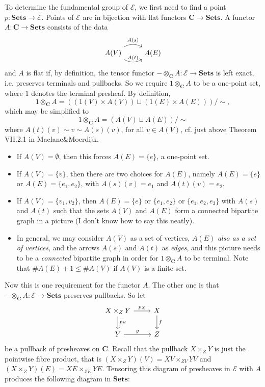To determine the fundamental group of $\mathscr{E}$, we first need to find a point $p : \mathbf{Sets} \to \mathscr{E}$. Points of $\mathscr{E}$ are in bijection with flat functors $\mathbf{C} \to \mathbf{Sets}$. A functor $A : \mathbf{C} \to \mathbf{Sets}$ consists of the data
\[ \begin{tikzcd} A(V) \arrow[r, bend left, "A(s)"] \arrow[r, bend right, "A(t)"] & A(E) \end{tikzcd} \]
and $A$ is flat if, by definition, the tensor functor $- \otimes_{\mathbf{C}} A : \mathscr{E} \to \mathbf{Sets}$ is left exact, i.e. preserves terminals and pullbacks. So we require $1 \otimes_{\mathbf{C}} A$ to be a one-point set, where $1$ denotes the terminal presheaf. By definition,
\[ 1 \otimes_{\mathbf{C}} A = \left( \left(1(V) \times A(V)\right) \sqcup \left(1(E) \times A(E) \right)\right) / \sim, \]
which may be simplified to
\[ 1 \otimes_{\mathbf{C}} A = \left( A(V) \sqcup A(E) \right) / \sim \]
where $A(t)(v) \sim v \sim A(s)(v)$, for all $v \in A(V)$, cf. just above Theorem VII.2.1 in Maclane\&Moerdijk.
\begin{itemize}
	\item If $A(V) = \emptyset$, then this forces $A(E) = \{e\}$, a one-point set.
	\item If $A(V) = \{v\}$, then there are two choices for $A(E)$, namely $A(E) = \{e\}$ or $A(E) = \{e_1,e_2\}$, with $A(s)(v) = e_1$ and $A(t)(v) = e_2$.
	\item If $A(V) = \{v_1,v_2\}$, then $A(E) = \{e\}$ or $\{e_1,e_2\}$ or $\{e_1,e_2,e_3\}$ with $A(s)$ and $A(t)$ such that the sets $A(V)$ and $A(E)$ form a connected bipartite graph in a picture (I don't know how to say this neatly).
	\item In general, we may consider $A(V)$ as a set of vertices, $A(E)$ \emph{also as a set of vertices}, and the arrows $A(s)$ and $A(t)$ as \emph{edges}, and this picture needs to be a \emph{connected} bipartite graph in order for $1 \otimes_{\mathbf{C}} A$ to be terminal. Note that $\# A(E) + 1 \leq \# A(V)$ if $A(V)$ is a finite set.
\end{itemize}
Now this is one requirement for the functor $A$. The other one is that $- \otimes_{\mathbf{C}} A : \mathscr{E} \to \mathbf{Sets}$ preserves pullbacks. So let
\[ \begin{tikzcd}
X \times_{Z} Y \arrow[r, "p_X"] \arrow[d, "p_Y"] & X \arrow[d, "f"] \\
Y \arrow[r, "g"] & Z
\end{tikzcd} \]
be a pullback of presheaves on $\mathbf{C}$. Recall that the pullback $X \times_Z Y$ is just the pointwise fibre product, that is $(X \times_Z Y)(V) = XV \times_{ZV} YV$ and $(X \times_Z Y)(E) = XE \times_{ZE} YE$. Tensoring this diagram of presheaves in $\mathscr{E}$ with $A$ produces the following diagram in $\mathbf{Sets}$:
